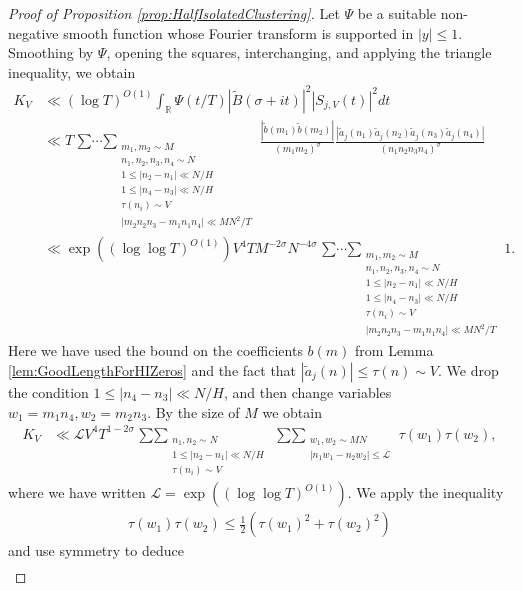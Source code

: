 \documentclass[12pt]{amsart}
\theoremstyle{plain}
\theoremstyle{definition}
\theoremstyle{remark}
\begin{document}
\begin{proof}[Proof of Proposition \ref{prop:HalfIsolatedClustering}]
Let $\Psi$ be a suitable non-negative smooth function whose Fourier transform is supported in $|y|\leq 1$. Smoothing by $\Psi$, opening the squares, interchanging, and applying the triangle inequality, we obtain
\begin{align*}
K_V &\ll (\log T)^{O(1)}\int_\mathbb{R}\Psi(t/T)|\tilde{B}(\sigma+it)|^2 |S_{j,V}(t)|^2 dt \\
&\ll T \mathop{\sum\cdots \sum}_{\substack{m_1,m_2 \sim M \\ n_1,n_2,n_3,n_4 \sim N \\ 1\leq |n_2 - n_1| \ll N/H \\ 1\leq |n_4-n_3| \ll N/H \\ \tau(n_i) \sim V \\ |m_2n_2n_3 - m_1n_1n_4| \ll MN^2/T}} \frac{|\tilde{b}(m_1)\tilde{b}(m_2)|}{(m_1m_2)^\sigma} \frac{|\tilde{a}_j(n_1)\tilde{a}_j(n_2)\tilde{a}_j(n_3)\tilde{a}_j(n_4)|}{(n_1n_2n_3n_4)^\sigma} \\
&\ll \exp((\log \log T)^{O(1)})V^4 T M^{-2\sigma}N^{-4\sigma}\mathop{\sum\cdots \sum}_{\substack{m_1,m_2 \sim M \\ n_1,n_2,n_3,n_4 \sim N \\ 1\leq |n_2 - n_1| \ll N/H \\ 1\leq |n_4-n_3| \ll N/H \\ \tau(n_i) \sim V \\ |m_2n_2n_3 - m_1n_1n_4| \ll MN^2/T}} 1.
\end{align*}
Here we have used the bound on the coefficients $b(m)$ from Lemma \ref{lem:GoodLengthForHIZeros} and the fact that $|\tilde{a}_j(n)|\leq\tau(n) \sim V$. We drop the condition $1\leq |n_4-n_3| \ll N/H$, and then change variables $w_1 = m_1n_4, w_2 = m_2n_3$. By the size of $M$ we obtain
\begin{align*}
K_V &\ll \mathcal{L}V^4 T^{1-2\sigma} \mathop{\sum\sum}_{\substack{n_1,n_2 \sim N \\ 1\leq |n_2-n_1| \ll N/H \\ \tau(n_i) \sim V}} \mathop{\sum\sum}_{\substack{w_1,w_2 \sim MN \\ |n_1w_1 - n_2w_2| \leq \mathcal{L}}} \tau(w_1)\tau(w_2),
\end{align*}
where we have written $\mathcal{L} = \exp((\log \log T)^{O(1)})$. We apply the inequality
\begin{align*}
\tau(w_1)\tau(w_2) \leq \frac{1}{2}(\tau(w_1)^2 + \tau(w_2)^2)
\end{align*}
and use symmetry to deduce
\begin{align*}

\end{align*}
\end{proof}
\end{document}
